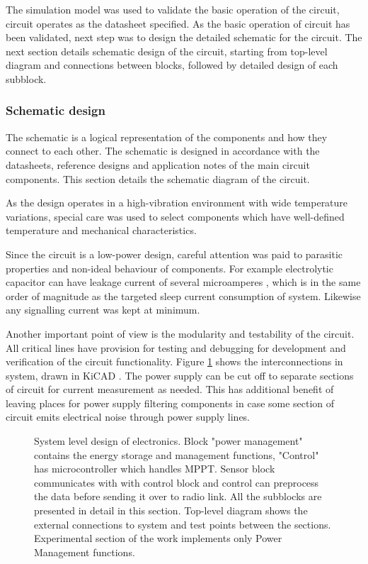 The simulation model was used to validate the basic operation of the circuit, circuit operates as the datasheet specified. As the basic operation of circuit has been validated, next step was to design the detailed schematic for the circuit. The next section details schematic design of the circuit, starting from top-level diagram and connections between blocks, followed by detailed design of each subblock. 

\subsubsection{Schematic design}
The schematic is a logical representation of the components and how they connect to each other. The schematic is designed in accordance with the datasheets, reference designs and application notes of the main circuit components. This section details the schematic diagram of the circuit.

As the design operates in a high-vibration environment with wide temperature variations, special care was used to select components which have well-defined temperature and mechanical characteristics. 

Since the circuit is a low-power design, careful attention was paid to parasitic properties and non-ideal behaviour of components. For example electrolytic capacitor can have leakage current of several microamperes \cite{Both2001}, which is in the same order of magnitude as the targeted sleep current consumption of system. Likewise any signalling current was kept at minimum. 

Another important point of view is the modularity and testability of the circuit. All critical lines have provision for testing and debugging for development and verification of the circuit functionality. Figure \ref{fig:circuit_blocklevel} shows the interconnections in system, drawn in KiCAD \cite{KiCAD}.  The power supply can be cut off to separate sections of circuit for current measurement as needed. This has additional benefit of leaving places for power supply filtering components in case some section of circuit emits electrical noise through power supply lines.

\begin{figure}
    \centering
    \def\svgwidth{\columnwidth}
    
    \caption{\label{fig:circuit_blocklevel} System level design of electronics. Block "power management" contains the energy storage and management functions, "Control" has microcontroller which handles MPPT. Sensor block communicates with with control block and control can preprocess the data before sending it over to radio link. All the subblocks are presented in detail in this section. Top-level diagram shows the external connections to system and test points between the sections. Experimental section of the work implements only Power Management functions.}
\end{figure}

